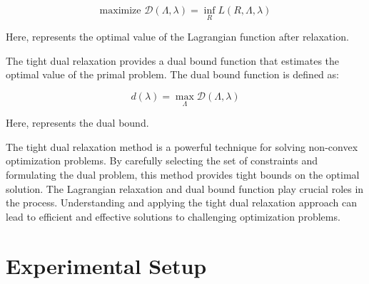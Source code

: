 \begin{equation}
	\text{maximize } \mathcal{D}(\Lambda, \lambda) = \inf_{R} L(R, \Lambda, \lambda)
\end{equation}

Here,  represents the optimal value of the Lagrangian function after relaxation.

The tight dual relaxation provides a dual bound function  that estimates the optimal value of the primal problem. The dual bound function is defined as:

\begin{equation}
	d(\lambda) = \max_{\Lambda} \mathcal{D}(\Lambda, \lambda)
\end{equation}


Here,  represents the dual bound.

The tight dual relaxation method is a powerful technique for solving non-convex optimization problems. By carefully selecting the set of constraints and formulating the dual problem, this method provides tight bounds on the optimal solution. The Lagrangian relaxation and dual bound function play crucial roles in the process. Understanding and applying the tight dual relaxation approach can lead to efficient and effective solutions to challenging optimization problems.




\section{Experimental Setup} \label{sec:2-pose-estimation-experimental-setup}

